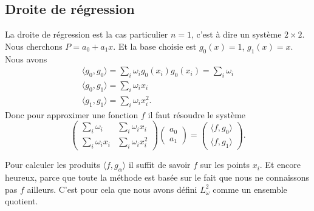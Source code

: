 \subsection{Droite de régression}

La droite de régression est la cas particulier \( n=1\), c'est à dire un système \( 2\times 2\). Nous cherchons \( P=a_0+a_1x\). Et la base choisie est \( g_0(x)=1\), \( g_1(x)=x\). Nous avons
\begin{subequations}
    \begin{align}
        \langle g_0, g_0\rangle =\sum_i\omega_ig_0(x_i)g_0(x_i)=\sum_i\omega_i\\
        \langle g_0, g_1\rangle =\sum_i\omega_ix_i\\
        \langle g_1, g_1\rangle =\sum_i\omega_ix_i^2.
    \end{align}
\end{subequations}
Donc pour approximer une fonction \( f\) il faut résoudre le système
\begin{equation}
    \begin{pmatrix}
        \sum_i\omega_i    &   \sum_i\omega_ix_i    \\ 
        \sum_i\omega_ix_i    &   \sum_i\omega_ix_i^2    
    \end{pmatrix}\begin{pmatrix}
        a_0    \\ 
        a_1    
    \end{pmatrix}=
    \begin{pmatrix}
        \langle f, g_0\rangle     \\ 
        \langle f, g_1\rangle     
    \end{pmatrix}.
\end{equation}
 
Pour calculer les produits \( \langle f, g_{\alpha}\rangle \) il suffit de savoir \( f\) sur les points \( x_i\). Et encore heureux, parce que toute la méthode est basée sur le fait que nous ne connaissons pas \( f\) ailleurs. C'est pour cela que nous avons défini \( L^2_{\omega}\) comme un ensemble quotient.

